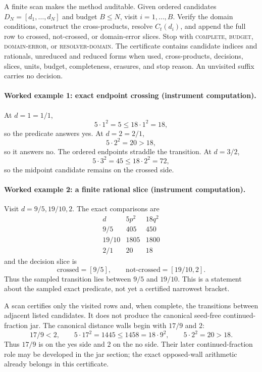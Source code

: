 A finite scan makes the method auditable.  Given ordered candidates
\(D_N=[d_1,\ldots,d_N]\) and budget \(B\le N\), visit \(i=1,\ldots,B\).  Verify the domain conditions, construct the
cross-products, resolve \(C_t(d_i)\), and append the full row to crossed, not-crossed, or domain-error slices.  Stop with
\textsc{complete}, \textsc{budget}, \textsc{domain-error}, or \textsc{resolver-domain}.  The certificate contains
candidate indices and rationals, unreduced and reduced forms when used, cross-products, decisions, slices, units,
budget, completeness, erasures, and stop reason.  An unvisited suffix carries no decision.

\paragraph{Worked example 1: exact endpoint crossing (instrument computation).}
At \(d=1=1/1\),
\[
                         5\cdot1^2=5\le18\cdot1^2=18,
\]
so the predicate answers yes.  At \(d=2=2/1\),
\[
                         5\cdot2^2=20>18,
\]
so it answers no.  The ordered endpoints straddle the transition.  At \(d=3/2\),
\[
                         5\cdot3^2=45\le18\cdot2^2=72,
\]
so the midpoint candidate remains on the crossed side.

\paragraph{Worked example 2: a finite rational slice (instrument computation).}
Visit \(d=9/5,19/10,2\).  The exact comparisons are
\[
\begin{array}{c|c|c}
d&5p^2&18q^2\\
\hline
9/5&405&450\\
19/10&1805&1800\\
2/1&20&18
\end{array}
\]
and the decision slice is
\[
 \text{crossed}=[9/5],\qquad
 \text{not-crossed}=[19/10,2].
\]
Thus the sampled transition lies between \(9/5\) and \(19/10\).  This is a statement about the sampled exact
predicate, not yet a certified narrowest bracket.

A scan certifies only the visited rows and, when complete, the transitions between adjacent listed candidates.  It does
not produce the canonical seed-free continued-fraction jar.  The canonical distance walls begin with \(17/9\) and
\(2\):
\[
 17/9<2,\qquad
 5\cdot17^2=1445\le1458=18\cdot9^2,\qquad
 5\cdot2^2=20>18.
\]
Thus \(17/9\) is on the yes side and \(2\) on the no side.  Their later continued-fraction role may be developed in
the jar section; the exact opposed-wall arithmetic already belongs in this certificate.

